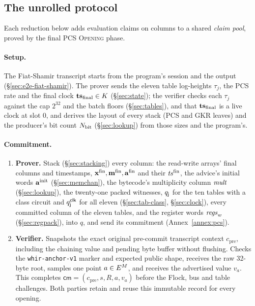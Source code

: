 \subsection{The unrolled protocol}\label{sec:e2e-unrolled}

Each reduction below adds evaluation claims on columns to a shared \emph{claim pool}, proved by the final PCS \textsc{Opening} phase.

\paragraph{Setup.}

The Fiat-Shamir transcript starts from the program's session and the output (\S\ref{sec:e2e-fiat-shamir}). The prover sends the eleven table log-heights $\tau_j$, the PCS rate and the final clock $\mathbf{ts}_{\mathrm{final}}\in K$ (\S\ref{sec:state}); the verifier checks each $\tau_j$ against the cap $2^{32}$ and the batch floors (\S\ref{sec:tables}), and that $\mathbf{ts}_{\mathrm{final}}$ is a live clock at slot $0$, and derives the layout of every stack (PCS and GKR leaves) and the producer's bit count $N_{\mathrm{bit}}$ (\S\ref{sec:lookup}) from those sizes and the program's.

\paragraph{Commitment.}

\begin{enumerate}
\item \textbf{Prover.} Stack (\S\ref{sec:stacking}) every column: the read-write arrays' final columns and timestamps, $\mathbf{x}^{\mathrm{fin}},\mathbf{m}^{\mathrm{fin}},\mathbf{a}^{\mathrm{fin}}$ and their $\mathit{ts}^{\mathrm{fin}}$, the advice's initial words $\mathbf{a}^{\mathrm{init}}$ (\S\ref{sec:memchan}), the bytecode's multiplicity column $\mathit{mult}$ (\S\ref{sec:lookup}), the twenty-one packed witnesses, $q_{\mathsf{j}}$ for the ten tables with a class circuit and $q^{\mathsf{clk}}_{\mathsf{j}}$ for all eleven (\S\ref{sec:tab-class}, \S\ref{sec:clock}), every committed column of the eleven tables, and the register words $\mathit{regs}_{w}$ (\S\ref{sec:regpack}), into $q$, and send its commitment (Annex~\ref{annex:pcs}).
\item \textbf{Verifier.} Snapshots the exact original pre-commit transcript context $c_{\mathrm{pre}}$, including the chaining value and pending byte buffer without flushing. Checks the \texttt{whir-anchor-v1} marker and expected public shape, receives the raw 32-byte root, samples one point $a\in E^M$, and receives the advertised value $v_a$. This completes $\mathsf{cm}=(c_{\mathrm{pre}},s,R,a,v_a)$ before the Flock, bus and table challenges. Both parties retain and reuse this immutable record for every opening.
\end{enumerate}

